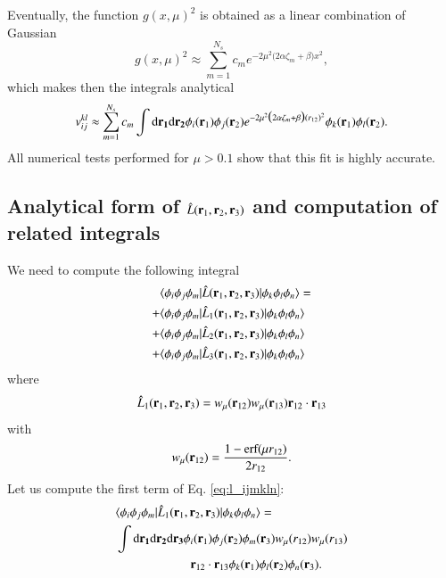 \documentclass[aip,jcp,reprint,noshowkeys,superscriptaddress,twocolumn]{revtex4-1}
\newcommand{\matelem}[3]{\langle #1 | #2 | #3 \rangle}
\newcommand{\bri}[1]{{\bf r}_{#1}}
\newcommand{\dr}[1]{\text{d}{\bf r_{#1}}}
\begin{document}
Eventually, the function $g(x,\mu)^2$ is obtained as a linear combination of Gaussian
\begin{equation}
 g(x,\mu)^2 \approx \sum_{m=1}^{N_s} c_m e^{-2\mu^2\big(2 \alpha \zeta_m + \beta\big) x^2},
\end{equation}
which makes then the integrals analytical
\begin{equation}
 v_{ij}^{kl} \approx \sum_{m=1}^{N_s} c_m \int \dr{1} \dr{2} \phi_i(\bri{1}) \phi_j(\bri{2}) e^{-2\mu^2\big(2 \alpha \zeta_m + \beta\big) (r_{12})^2} \phi_k(\bri{1}) \phi_l(\bri{2}).
\end{equation}
All numerical tests performed for $\mu > 0.1$ show that this fit is highly accurate. 

\subsection{Analytical form of $\hat{L}(\bri{1},\bri{2},\bri{3})$ and computation of related integrals }
We need to compute the following integral 
\begin{equation}
 \label{eq:l_ijmkln}
 \begin{aligned}
 &  \matelem{\phi_i \phi_j \phi_m}{\hat{L}(\bri{1},\bri{2},\bri{3})}{\phi_k \phi_l \phi_n} = \\
 +& \matelem{\phi_i \phi_j \phi_m}{\hat{L}_1(\bri{1},\bri{2},\bri{3})}{\phi_k \phi_l \phi_n} \\
 +& \matelem{\phi_i \phi_j \phi_m}{\hat{L}_2(\bri{1},\bri{2},\bri{3})}{\phi_k \phi_l \phi_n} \\
 +& \matelem{\phi_i \phi_j \phi_m}{\hat{L}_3(\bri{1},\bri{2},\bri{3})}{\phi_k \phi_l \phi_n} 
 \end{aligned}
\end{equation}
where 
\begin{equation}
 \hat{L}_1(\bri{1},\bri{2},\bri{3}) = w_\mu(\bri{12}) w_\mu(\bri{13}) \bri{12} \cdot \bri{13}
\end{equation}
with 
\begin{equation}
 w_\mu(\bri{12}) = \frac{1 - \text{erf}(\mu r_{12})}{2 r_{12}}.
\end{equation}
Let us compute the first term of Eq. \eqref{eq:l_ijmkln}:
\begin{equation}
 \begin{aligned}
 & \matelem{\phi_i \phi_j \phi_m}{\hat{L}_1(\bri{1},\bri{2},\bri{3})}{\phi_k \phi_l \phi_n} = \\
 & \int \dr{1} \dr{2} \dr{3} \phi_i(\bri{1}) \phi_j(\bri{2}) \phi_m(\bri{3}) w_{\mu}(r_{12}) w_{\mu}(r_{13}) \\ 
 &\qquad \qquad \qquad   \bri{12} \cdot \bri{13}  \phi_k(\bri{1}) \phi_l(\bri{2}) \phi_n(\bri{3}).
 \end{aligned}
\end{equation}
\end{document}
